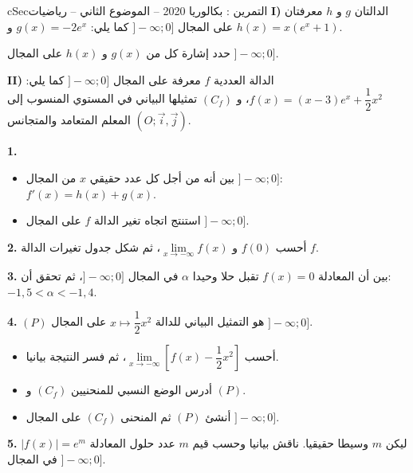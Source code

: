 \documentclass[12pt,a4paper]{article}
\newenvironment{BOX}[2]{\begin{otherlanguage}{english}\begin{arbox}{#1}{#2}}{\end{arbox}\end{otherlanguage}}
\newcounter{exo}
\newenvironment{tamrin}[1]{\stepcounter{exo}\begin{BOX}{cSec}{التمرين \theexo: #1}}{\end{BOX}}
\newenvironment{sq}{\begin{itemize}[leftmargin=2.4em,itemsep=3pt]}{\end{itemize}}
\newcommand{\qa}{\item[(أ)]}\newcommand{\qb}{\item[(ب)]}\newcommand{\qc}{\item[(جـ)]}\newcommand{\qd}{\item[(د)]}\newcommand{\qe}{\item[(هـ)]}
\newcommand{\QQ}[1]{\par\smallskip\textbf{#1.} }
\begin{document}
\begin{tamrin}{بكالوريا 2020 -- الموضوع الثاني -- رياضيات}
\textbf{I)} الدالتان $g$ و $h$ معرفتان على المجال $]{-}\infty;0]$ كما يلي: $g(x)=-2e^{x}$ و $h(x)=x\left(e^{x}+1\right)$.

حدد إشارة كل من $g(x)$ و $h(x)$ على المجال $]{-}\infty;0]$.

\textbf{II)} الدالة العددية $f$ معرفة على المجال $]{-}\infty;0]$ كما يلي: $f(x)=(x-3)e^{x}+\dfrac12x^2$، و $(C_f)$ تمثيلها البياني في المستوي المنسوب إلى المعلم المتعامد والمتجانس $(O;\vec i,\vec j)$.
\QQ{1}
\begin{sq}
\qa بين أنه من أجل كل عدد حقيقي $x$ من المجال $]{-}\infty;0]$: $f'(x)=h(x)+g(x)$.
\qb استنتج اتجاه تغير الدالة $f$ على المجال $]{-}\infty;0]$.
\end{sq}
\QQ{2} أحسب $f(0)$ و $\lim\limits_{x\to-\infty}f(x)$، ثم شكل جدول تغيرات الدالة $f$.
\QQ{3} بين أن المعادلة $f(x)=0$ تقبل حلا وحيدا $\alpha$ في المجال $]{-}\infty;0]$، ثم تحقق أن: $-1{,}5<\alpha<-1{,}4$.
\QQ{4} $(P)$ هو التمثيل البياني للدالة $x\mapsto\dfrac12x^2$ على المجال $]{-}\infty;0]$.
\begin{sq}
\qa أحسب $\lim\limits_{x\to-\infty}\left[f(x)-\dfrac12x^2\right]$، ثم فسر النتيجة بيانيا.
\qb أدرس الوضع النسبي للمنحنيين $(C_f)$ و $(P)$.
\qc أنشئ $(P)$ ثم المنحنى $(C_f)$ على المجال $]{-}\infty;0]$.
\end{sq}
\QQ{5} ليكن $m$ وسيطا حقيقيا. ناقش بيانيا وحسب قيم $m$ عدد حلول المعادلة $|f(x)|=e^{m}$ في المجال $]{-}\infty;0]$.
\end{tamrin}
\end{document}
